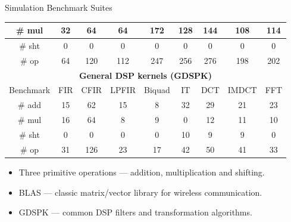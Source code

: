 \documentclass{beamer}
\begin{document}
\begin{CJK}{UTF8}{bkai}
\begin{frame}{Simulation Benchmark Suites}
\begin{table}[!ht]
{\begin{tabular}{|c|c|c|c|c|c|c|c|c|}
                            \# mul            &  32    &  64    &   64    &   172    &  128   & 144  &  108   & 114   \\ \hline
                            \# sht            &   0    &   0    &    0    &     0    &    0   &   0  &    0   &   0   \\ \hline
                            \# op             &  64    & 120    &  112    &   247    &  256   & 276  &  198   & 202   \\ \hline
                            \multicolumn{9}{|c|}{\textbf{General DSP kernels (GDSPK)}}                     \\ \hline
                            Benchmark              & FIR    & CFIR   & LPFIR   & Biquad   & IT     & DCT  & IMDCT  & FFT   \\ \hline
                            \# add            & 15     &  62    &   15    &    8     &  32    &  29  &   21   &  23   \\ \hline
                            \# mul            & 16     &  64    &    8    &    9     &   0    &  12  &   11   &  10   \\ \hline
                            \# sht            &  0     &   0    &    0    &    0     &  10    &   9  &    9   &   0   \\ \hline
                            \# op             & 31     & 126    &   23    &   17     &  42    &  50  &   41   &  33   \\ \hline
                        \end{tabular}
                    }
                \end{table}
                \begin{itemize}
                    \pause
                    \item Three primitive operations --- addition, multiplication and shifting.
                    \pause
                    \item BLAS --- classic matrix/vector library for wireless communication.
                    \pause
                    \item GDSPK --- common DSP filters and transformation algorithms.
                \end{itemize}
            \end{frame}


\end{CJK}
\end{document}
